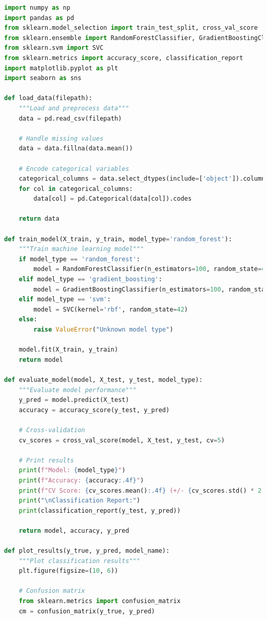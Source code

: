 \begin{lstlisting}[language=Python, caption={Пример алгоритма машинного обучения}, label={lst:ml_algorithm}, style=breakable]
import numpy as np
import pandas as pd
from sklearn.model_selection import train_test_split, cross_val_score
from sklearn.ensemble import RandomForestClassifier, GradientBoostingClassifier
from sklearn.svm import SVC
from sklearn.metrics import accuracy_score, classification_report
import matplotlib.pyplot as plt
import seaborn as sns

def load_data(filepath):
    """Load and preprocess data"""
    data = pd.read_csv(filepath)
    
    # Handle missing values
    data = data.fillna(data.mean())
    
    # Encode categorical variables
    categorical_columns = data.select_dtypes(include=['object']).columns
    for col in categorical_columns:
        data[col] = pd.Categorical(data[col]).codes
    
    return data

def train_model(X_train, y_train, model_type='random_forest'):
    """Train machine learning model"""
    if model_type == 'random_forest':
        model = RandomForestClassifier(n_estimators=100, random_state=42)
    elif model_type == 'gradient_boosting':
        model = GradientBoostingClassifier(n_estimators=100, random_state=42)
    elif model_type == 'svm':
        model = SVC(kernel='rbf', random_state=42)
    else:
        raise ValueError("Unknown model type")
    
    model.fit(X_train, y_train)
    return model

def evaluate_model(model, X_test, y_test, model_type):
    """Evaluate model performance"""
    y_pred = model.predict(X_test)
    accuracy = accuracy_score(y_test, y_pred)
    
    # Cross-validation
    cv_scores = cross_val_score(model, X_test, y_test, cv=5)
    
    # Print results
    print(f"Model: {model_type}")
    print(f"Accuracy: {accuracy:.4f}")
    print(f"CV Score: {cv_scores.mean():.4f} (+/- {cv_scores.std() * 2:.4f})")
    print("\nClassification Report:")
    print(classification_report(y_test, y_pred))
    
    return model, accuracy, y_pred

def plot_results(y_true, y_pred, model_name):
    """Plot classification results"""
    plt.figure(figsize=(10, 6))
    
    # Confusion matrix
    from sklearn.metrics import confusion_matrix
    cm = confusion_matrix(y_true, y_pred)
    

\end{lstlisting}
